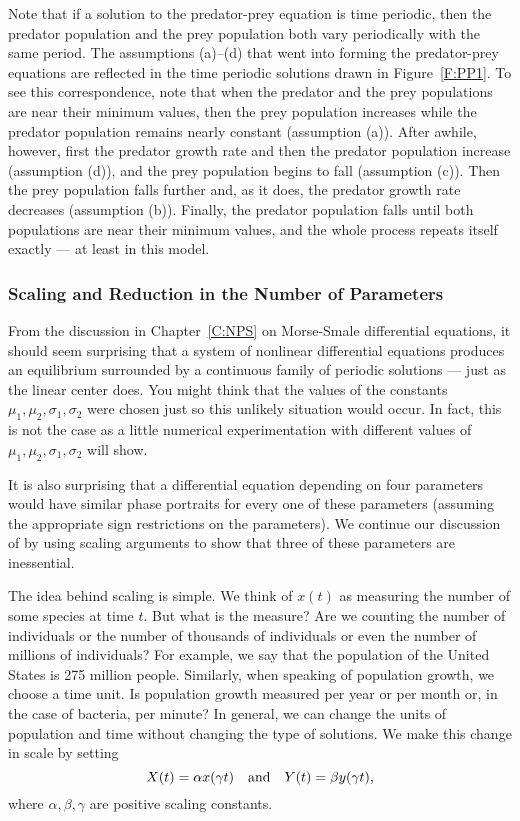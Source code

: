 \documentclass{ximera}
\begin{document}
Note that if a solution to the predator-prey equation is time periodic, then 
the predator population and the prey population both vary periodically with 
the same period.  The assumptions (a)--(d) that went into forming the
predator-prey equations  are reflected in the time periodic 
solutions drawn in Figure~\ref{F:PP1}.  To see this correspondence, note that 
when the predator and the prey populations are near their minimum values, then 
the prey population increases while the predator population remains nearly 
constant (assumption (a)).  After awhile, however, first the predator growth
rate and then the predator population increase (assumption (d)), and the prey 
population begins to fall (assumption (c)).  Then the prey population falls 
further and, as it does, the predator growth rate decreases (assumption (b)). 
Finally, the predator population falls until both populations are near their 
minimum values, and the whole process repeats itself exactly --- at least in
this model.  

\subsubsection*{Scaling and Reduction in the Number of Parameters}

From the discussion in Chapter~\ref{C:NPS} on Morse-Smale differential
equations, it should seem surprising that a system of nonlinear differential 
equations produces an equilibrium surrounded by a continuous family of 
periodic solutions --- just as the linear center does.  You 
might think that the values of the constants $\mu_1,\mu_2,\sigma_1,\sigma_2$ 
were chosen just so this unlikely situation would occur.  In fact, this is 
not the case as a little numerical experimentation with different values of 
$\mu_1,\mu_2,\sigma_1,\sigma_2$ will show.  

It is also surprising that a differential equation depending on four
parameters would have similar phase portraits for every one of
these parameters (assuming the appropriate sign restrictions on
the parameters).  We continue our discussion of  by using scaling
arguments to show that three of these parameters are inessential.  

The idea behind scaling is simple.  We think of $x(t)$ as measuring the 
number of some species at time $t$.  But what is the measure?  Are we 
counting the number of individuals or the number of thousands of
individuals or even the number of millions of individuals?  For example, 
we say that the population of the United States is 275 
million people.  Similarly, when speaking of population growth, 
we choose a time unit.  Is population growth measured per year 
or per month or, in the case of bacteria, per minute?  In general, we can 
change the units of population and time without changing the type of 
solutions.  We make this change in scale by setting  
\[
X(t) = \alpha x(\gamma t)  \quad\mbox{and}\quad  Y(t) = \beta y(\gamma t),
\]
where $\alpha,\beta,\gamma$ are positive scaling constants.  
\end{document}
